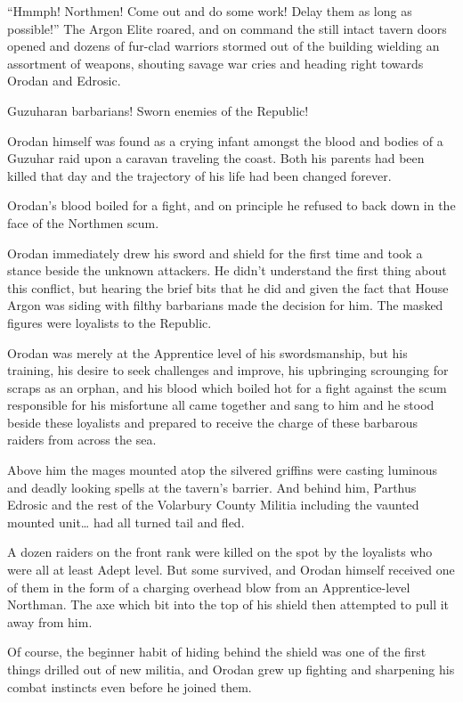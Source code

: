 \documentclass[a4paper,10pt]{book}
\begin{document}
“Hmmph! Northmen! Come out and do some work! Delay them as long as possible!” The Argon Elite roared, and on command the still intact tavern doors opened and dozens of fur-clad warriors stormed out of the building wielding an assortment of weapons, shouting savage war cries and heading right towards Orodan and Edrosic.\par
Guzuharan barbarians! Sworn enemies of the Republic!\par
Orodan himself was found as a crying infant amongst the blood and bodies of a Guzuhar raid upon a caravan traveling the coast. Both his parents had been killed that day and the trajectory of his life had been changed forever.\par
Orodan’s blood boiled for a fight, and on principle he refused to back down in the face of the Northmen scum.\par
Orodan immediately drew his sword and shield for the first time and took a stance beside the unknown attackers. He didn’t understand the first thing about this conflict, but hearing the brief bits that he did and given the fact that House Argon was siding with filthy barbarians made the decision for him. The masked figures were loyalists to the Republic.\par
Orodan was merely at the Apprentice level of his swordsmanship, but his training, his desire to seek challenges and improve, his upbringing scrounging for scraps as an orphan, and his blood which boiled hot for a fight against the scum responsible for his misfortune all came together and sang to him and he stood beside these loyalists and prepared to receive the charge of these barbarous raiders from across the sea.\par
Above him the mages mounted atop the silvered griffins were casting luminous and deadly looking spells at the tavern’s barrier. And behind him, Parthus Edrosic and the rest of the Volarbury County Militia including the vaunted mounted unit… had all turned tail and fled.\par
A dozen raiders on the front rank were killed on the spot by the loyalists who were all at least Adept level. But some survived, and Orodan himself received one of them in the form of a charging overhead blow from an Apprentice-level Northman. The axe which bit into the top of his shield then attempted to pull it away from him.\par
Of course, the beginner habit of hiding behind the shield was one of the first things drilled out of new militia, and Orodan grew up fighting and sharpening his combat instincts even before he joined them.\par
\end{document}
